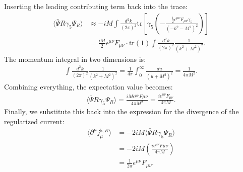 Inserting the leading contributing term back into the trace:
\begin{align}
    \langle \bar{\Psi}R \gamma_5 \Psi_R \rangle &\approx -i M \int \frac{d^2k}{(2\pi)^2} \text{tr} \left[ \gamma_5 \left( - \frac{\frac{1}{2} \epsilon^{\mu\nu} F_{\mu\nu} \gamma_5}{(-k^2 - M^2)^2} \right) \right] \\ 
    &= \frac{i M}{2} \epsilon^{\mu\nu} F_{\mu\nu} \cdot \text{tr}(1) \int \frac{d^2k}{(2\pi)^2} \frac{1}{(k^2 + M^2)^2}.
\end{align}
The momentum integral in two dimensions is:
\begin{align}
    \int \frac{d^2k}{(2\pi)^2} \frac{1}{(k^2 + M^2)^2} = \frac{1}{4\pi} \int_0^\infty \frac{du}{(u+M^2)^2} = \frac{1}{4\pi M^2}.
\end{align}
Combining everything, the expectation value becomes:
\begin{align}
    \langle \bar{\Psi}R \gamma_5 \Psi_R \rangle = \frac{i M \epsilon^{\mu\nu} F{\mu\nu}}{4\pi M^2} = \frac{i \epsilon^{\mu\nu} F_{\mu\nu}}{4\pi M}.
\end{align}
Finally, we substitute this back into the expression for the divergence of the regularized current:
\begin{align}
    \langle \partial^\mu j_\mu^{5,R} \rangle &= -2iM \langle \bar{\Psi}R \gamma_5 \Psi_R \rangle \\
    &= -2iM \left( \frac{i \epsilon^{\mu\nu} F{\mu\nu}}{4\pi M} \right) \\
    &= \frac{1}{2\pi} \epsilon^{\mu\nu} F_{\mu\nu}.
\end{align}
